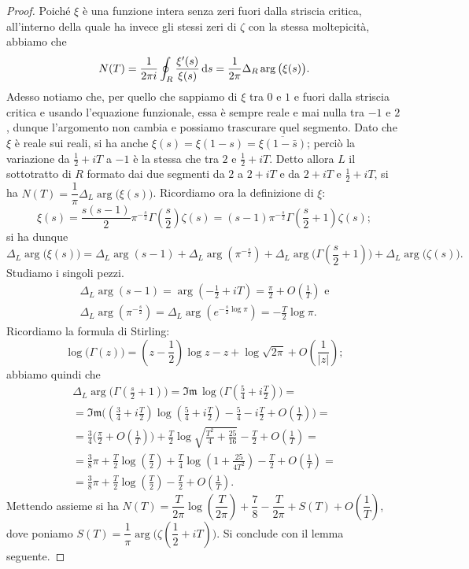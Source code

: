 \begin{proof}
  Poiché $\xi$ è una funzione intera senza zeri fuori dalla striscia critica, all'interno della quale ha invece gli stessi zeri di $\zeta$ con la stessa moltepicità, abbiamo che
  $$N(T)=\frac{1}{2\pi i} \oint_R \frac{\xi'(s)}{\xi(s)}\mathop{}\!\mathrm{d} s=\frac{1}{2\pi}\Delta_R \arg\big(\xi(s)\big).$$
  Adesso notiamo che, per quello che sappiamo di $\xi$ tra $0$ e $1$ e fuori dalla striscia critica e usando l'equazione funzionale, essa è sempre reale e mai nulla tra $-1$ e $2$, dunque l'argomento non cambia e possiamo trascurare quel segmento. Dato che $\xi$ è reale sui reali, si ha anche $\xi(s)=\xi(1-s)=\overline{\xi(1-\bar{s})}$; perciò la variazione da $\frac{1}{2}+iT$ a $-1$ è la stessa che tra $2$ e $\frac{1}{2}+iT$.
  Detto allora $L$ il sottotratto di $R$ formato dai due segmenti da $2$ a $2+iT$ e da $2+iT$ e $\frac{1}{2}+iT$, si ha $N(T)=\dfrac{1}{\pi}\Delta_L \arg\big(\xi(s)\big)$. Ricordiamo ora la definizione di $\xi$:
  $$\xi(s)=\frac{s(s-1)}{2}\pi^{-\frac{s}{2}}\Gamma\left(\frac{s}{2}\right)\zeta(s)=(s-1)\pi^{-\frac{s}{2}}\Gamma\left(\frac{s}{2}+1\right)\zeta(s);$$
  si ha dunque
  $$\Delta_L\arg\big(\xi(s)\big)=\Delta_L\arg(s-1)+\Delta_L\arg\left(\pi^{-\frac{s}{2}}\right)+\Delta_L\arg\Bigg(\Gamma\left(\frac{s}{2}+1\right)\Bigg)+\Delta_L\arg\big(\zeta(s)\big).$$
  Studiamo i singoli pezzi.
  \begin{gather*}
    \Delta_L\arg(s-1)=\arg\left(-\frac{1}{2}+iT\right)=\frac{\pi}{2}+O\left(\frac{1}{T}\right) \text{ e}\\
    \Delta_L\arg\left(\pi^{-\frac{s}{2}}\right)=\Delta_L\arg\left(e^{-\frac{s}{2}\log{\pi}}\right)=-\frac{T}{2}\log{\pi}.
  \end{gather*}
  Ricordiamo la formula di Stirling:
  $$\log\big(\Gamma(z)\big)=\left(z-\frac{1}{2}\right)\log{z}-z+\log{\sqrt{2\pi}}+O\left(\frac{1}{|z|}\right);$$
  abbiamo quindi che
  \begin{gather*}
    \Delta_L\arg\Bigg(\Gamma\left(\frac{s}{2}+1\right)\Bigg)=\mathfrak{Im}\,\log\Bigg(\Gamma\left(\frac{5}{4}+i\frac{T}{2}\right)\Bigg)= \\
    =\mathfrak{Im}\Bigg(\left(\frac{3}{4}+i\frac{T}{2}\right)\log\left(\frac{5}{4}+i\frac{T}{2}\right)-\frac{5}{4}-i\frac{T}{2}+O\left(\frac{1}{T}\right)\Bigg)= \\
    =\frac{3}{4}\Bigg(\frac{\pi}{2}+O\left(\frac{1}{T}\right)\Bigg)+\frac{T}{2}\log\sqrt{\frac{T^2}{4}+\frac{25}{16}}-\frac{T}{2}+O\left(\frac{1}{T}\right)=\\
    =\frac{3}{8}\pi+\frac{T}{2}\log\left(\frac{T}{2}\right)+\frac{T}{4}\log\left(1+\frac{25}{4T^2}\right)-\frac{T}{2}+O\left(\frac{1}{T}\right)=\\
    =\frac{3}{8}\pi+\frac{T}{2}\log\left(\frac{T}{2}\right)-\frac{T}{2}+O\left(\frac{1}{T}\right).
  \end{gather*}
  Mettendo assieme si ha $N(T)=\dfrac{T}{2\pi}\log\left(\dfrac{T}{2\pi}\right)+\dfrac{7}{8}-\dfrac{T}{2\pi}+S(T)+O\left(\dfrac{1}{T}\right)$, dove poniamo $S(T)=\dfrac{1}{\pi}\arg\Bigg(\zeta\left(\dfrac{1}{2}+iT\right)\Bigg)$. Si conclude con il lemma seguente.
\end{proof}


